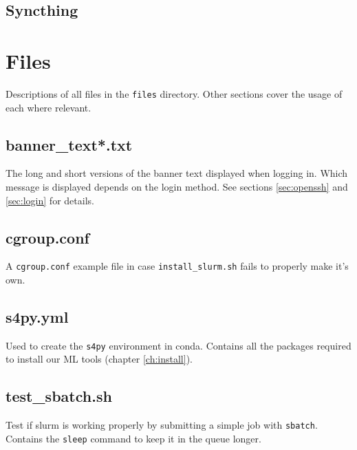 \documentclass[10pt,letterpaper]{report}
\begin{document}
\section{Syncthing}					\label{sec:syncthing}
	

\chapter{Files}						\label{ch:files}
Descriptions of all files in the \texttt{files} directory. Other sections cover the usage of each where relevant.

\section{banner\_text*.txt}	\label{sec:bannerText}
The long and short versions of the banner text displayed when logging in. Which message is displayed depends on the login method. See sections \ref{sec:openssh} and \ref{sec:login} for details.

\section{cgroup.conf}				\label{sec:cgroup}
A \texttt{cgroup.conf} example file in case \texttt{install\_slurm.sh} fails to properly make it's own.

\section{s4py.yml}					\label{sec:s4py}
Used to create the \texttt{s4py} environment in conda. Contains all the packages required to install our ML tools (chapter \ref{ch:install}).

\section{test\_sbatch.sh}			\label{sec:sbatchTest}
Test if slurm is working properly by submitting a simple job with \texttt{sbatch}. Contains the \texttt{sleep} command to keep it in the queue longer.



\end{document}
